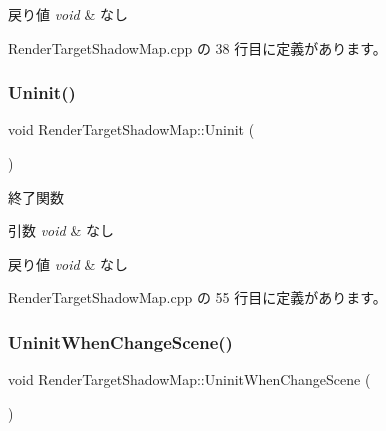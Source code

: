 \begin{DoxyRetVals}{戻り値}
{\em void} & なし \\
\hline
\end{DoxyRetVals}


 Render\+Target\+Shadow\+Map.\+cpp の 38 行目に定義があります。

\mbox{\label{class_render_target_shadow_map_a51ad9a4afe326c1bf93e342cb0b0847b}} 
\subsubsection{\texorpdfstring{Uninit()}{Uninit()}}
{\footnotesize\ttfamily void Render\+Target\+Shadow\+Map\+::\+Uninit (\begin{DoxyParamCaption}{ }\end{DoxyParamCaption})}



終了関数 


\begin{DoxyParams}{引数}
{\em void} & なし \\
\hline
\end{DoxyParams}

\begin{DoxyRetVals}{戻り値}
{\em void} & なし \\
\hline
\end{DoxyRetVals}


 Render\+Target\+Shadow\+Map.\+cpp の 55 行目に定義があります。

\mbox{\label{class_render_target_shadow_map_ad81761c98d1ce21e104d28cf7b472199}} 
\subsubsection{\texorpdfstring{Uninit\+When\+Change\+Scene()}{UninitWhenChangeScene()}}
{\footnotesize\ttfamily void Render\+Target\+Shadow\+Map\+::\+Uninit\+When\+Change\+Scene (\begin{DoxyParamCaption}{ }\end{DoxyParamCaption})}



